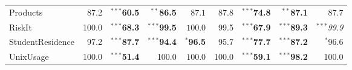 \documentclass{article}
\newcommand{\schemaForTable}[1]{#1\xspace}
\newcommand{\ProductsForTable}{\schemaForTable{Products}}
\newcommand{\RiskItForTable}{\schemaForTable{RiskIt}}
\newcommand{\StudentResidenceForTable}{\schemaForTable{StudentResidence}}
\newcommand{\UnixUsageForTable}{\schemaForTable{UnixUsage}}
\begin{document}
\begin{table}[!ht]
\begin{center}
{\begin{tabular}{lrrrr|rrrr}
\ProductsForTable&87.2&$^{\ast\ast\ast}$\textbf{60.5}&$^{\ast\ast}$\textbf{86.5}&$87.1$&87.8&$^{\ast\ast\ast}$\textbf{74.8}&$^{\ast\ast}$\textbf{87.1}&87.7\\
\RiskItForTable&100.0&$^{\ast\ast\ast}$\textbf{68.3}&$^{\ast\ast\ast}$\textbf{99.5}&$100.0$&99.5&$^{\ast\ast\ast}$\textbf{67.9}&$^{\ast\ast\ast}$\textbf{89.3}&$^{\ast\ast\ast}$\textit{99.9}\\
\StudentResidenceForTable&97.2&$^{\ast\ast\ast}$\textbf{87.7}&$^{\ast\ast\ast}$\textbf{94.4}&$^{\ast}$\textbf{96.5}&95.7&$^{\ast\ast\ast}$\textbf{77.7}&$^{\ast\ast\ast}$\textbf{87.2}&$^{\ast}$96.6\\
\UnixUsageForTable&100.0&$^{\ast\ast\ast}$\textbf{51.4}&100.0&$100.0$&100.0&$^{\ast\ast\ast}$\textbf{59.1}&$^{\ast\ast\ast}$\textbf{98.2}&100.0\\      \hline
      \end{tabular}
    }
  \end{center}
\end{table}
\end{document}

